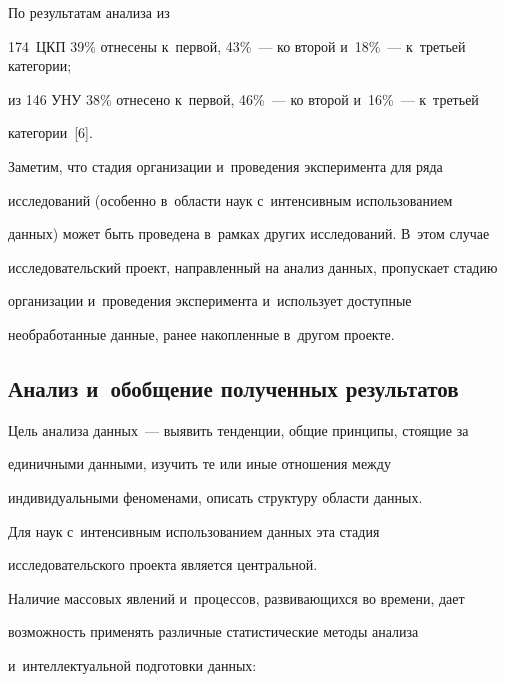  По результатам анализа из 

174~ЦКП 39\% отнесены к~первой, 43\%~--- ко второй и~18\%~--- к~третьей категории; 

из 146 УНУ 38\% отнесено к~первой, 46\%~--- ко второй и~16\%~--- к~третьей 

категории~[6].



      

      Заметим, что стадия организации и~проведения эксперимента для ряда 

исследований (особенно в~области наук с~интенсивным использованием 

данных) может быть проведена в~рамках других исследований. В~этом случае 

исследовательский проект, направленный на анализ данных, пропускает стадию 

организации и~проведения эксперимента и~использует доступные 

необработанные данные, ранее накопленные в~другом проекте.

    



    

\subsection*{Анализ и~обобщение полученных результатов}

    

    

    Цель анализа данных~--- выявить тенденции, общие принципы, стоящие за 

единичными данными, изучить те или иные отношения между 

индивидуальными феноменами, описать структуру области данных.

    

    Для наук с~интенсивным использованием данных эта стадия 

исследовательского проекта является центральной.

    

    Наличие массовых явлений и~процессов, развивающихся во времени, дает 

возможность применять различные статистические методы анализа 

и~интеллектуальной подготовки данных:

